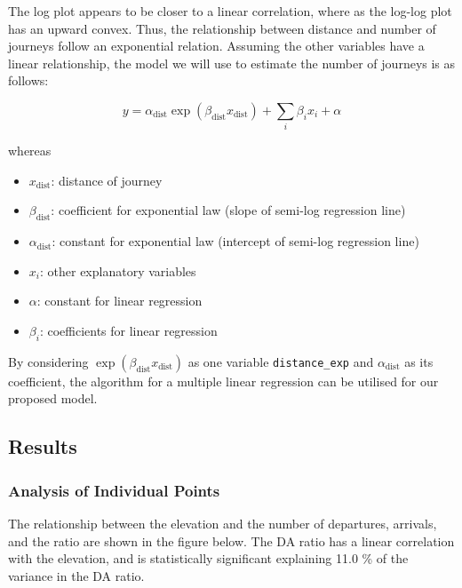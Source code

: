 \documentclass[
  a4paper,
  DIV=11,
  numbers=noendperiod]{scrartcl}
\providecommand{\tightlist}{%
  \setlength{\itemsep}{0pt}\setlength{\parskip}{0pt}}\usepackage{longtable,booktabs,array}
\begin{document}
The log plot appears to be closer to a linear correlation, where as the
log-log plot has an upward convex. Thus, the relationship between
distance and number of journeys follow an exponential relation. Assuming
the other variables have a linear relationship, the model we will use to
estimate the number of journeys is as follows:

\[
y = \alpha_\text{dist} \exp(\beta_\text{dist} x_\text{dist}) + \sum_i{\beta_ix_i} + \alpha
\]

whereas

\begin{itemize}
\tightlist
\item
  \(x_{\text{dist}}\): distance of journey
\item
  \(\beta_\text{dist}\): coefficient for exponential law (slope of
  semi-log regression line)
\item
  \(\alpha_\text{dist}\): constant for exponential law (intercept of
  semi-log regression line)
\item
  \(x_i\): other explanatory variables
\item
  \(\alpha\): constant for linear regression
\item
  \(\beta_i\): coefficients for linear regression
\end{itemize}

By considering \(\exp(\beta_\text{dist} x_\text{dist})\) as one variable
\texttt{distance\_exp} and \(\alpha_\text{dist}\) as its coefficient,
the algorithm for a multiple linear regression can be utilised for our
proposed model.

\hypertarget{results}{%
\subsection{Results}\label{results}}

\hypertarget{analysis-of-individual-points}{%
\subsubsection{Analysis of Individual
Points}\label{analysis-of-individual-points}}

The relationship between the elevation and the number of departures,
arrivals, and the ratio are shown in the figure below. The DA ratio has
a linear correlation with the elevation, and is statistically
significant explaining 11.0 \% of the variance in the DA ratio.
\end{document}
